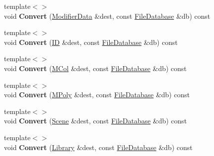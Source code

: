 \begin{DoxyCompactItemize}
\item 
\hypertarget{class_assimp_1_1_blender_1_1_structure_ab5cfa99586d1594a1a48132ead5921e6}{{\footnotesize template$<$$>$ }\\void {\bfseries Convert} (\hyperlink{struct_assimp_1_1_blender_1_1_modifier_data}{Modifier\+Data} \&dest, const \hyperlink{class_assimp_1_1_blender_1_1_file_database}{File\+Database} \&db) const }\label{class_assimp_1_1_blender_1_1_structure_ab5cfa99586d1594a1a48132ead5921e6}

\item 
\hypertarget{class_assimp_1_1_blender_1_1_structure_a830db7dcfbcc246c07dd6c3a1e6d2d68}{{\footnotesize template$<$$>$ }\\void {\bfseries Convert} (\hyperlink{struct_assimp_1_1_blender_1_1_i_d}{I\+D} \&dest, const \hyperlink{class_assimp_1_1_blender_1_1_file_database}{File\+Database} \&db) const }\label{class_assimp_1_1_blender_1_1_structure_a830db7dcfbcc246c07dd6c3a1e6d2d68}

\item 
\hypertarget{class_assimp_1_1_blender_1_1_structure_a6f0a4bed83cad1a7d6f07596983dbae0}{{\footnotesize template$<$$>$ }\\void {\bfseries Convert} (\hyperlink{struct_assimp_1_1_blender_1_1_m_col}{M\+Col} \&dest, const \hyperlink{class_assimp_1_1_blender_1_1_file_database}{File\+Database} \&db) const }\label{class_assimp_1_1_blender_1_1_structure_a6f0a4bed83cad1a7d6f07596983dbae0}

\item 
\hypertarget{class_assimp_1_1_blender_1_1_structure_a7fcc584439675dc8faea7630870e32af}{{\footnotesize template$<$$>$ }\\void {\bfseries Convert} (\hyperlink{struct_assimp_1_1_blender_1_1_m_poly}{M\+Poly} \&dest, const \hyperlink{class_assimp_1_1_blender_1_1_file_database}{File\+Database} \&db) const }\label{class_assimp_1_1_blender_1_1_structure_a7fcc584439675dc8faea7630870e32af}

\item 
\hypertarget{class_assimp_1_1_blender_1_1_structure_ac4e62887d11796f451ccbaf175a9c8ac}{{\footnotesize template$<$$>$ }\\void {\bfseries Convert} (\hyperlink{struct_assimp_1_1_blender_1_1_scene}{Scene} \&dest, const \hyperlink{class_assimp_1_1_blender_1_1_file_database}{File\+Database} \&db) const }\label{class_assimp_1_1_blender_1_1_structure_ac4e62887d11796f451ccbaf175a9c8ac}

\item 
\hypertarget{class_assimp_1_1_blender_1_1_structure_a76e1755c00db79158c1e38d2c8d71e2b}{{\footnotesize template$<$$>$ }\\void {\bfseries Convert} (\hyperlink{struct_assimp_1_1_blender_1_1_library}{Library} \&dest, const \hyperlink{class_assimp_1_1_blender_1_1_file_database}{File\+Database} \&db) const }\label{class_assimp_1_1_blender_1_1_structure_a76e1755c00db79158c1e38d2c8d71e2b}


\end{DoxyCompactItemize}
